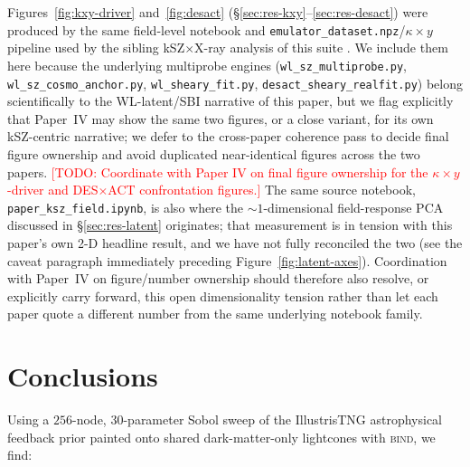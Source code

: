 \documentclass[11pt]{article}
\newcommand{\bind}{\textsc{bind}}
\newcommand{\kappay}{\kappa\times y}
\newcommand{\todo}[1]{\textcolor{red}{[TODO: #1]}}
\begin{document}
Figures~\ref{fig:kxy-driver} and~\ref{fig:desact}
(\S\ref{sec:res-kxy}–\ref{sec:res-desact}) were produced by the same
field-level notebook and \texttt{emulator\_dataset.npz}/$\kappay$ pipeline
used by the sibling kSZ$\times$X-ray analysis of this suite
\citep[Paper~IV, in prep]{bindIV}. We include them here because the
underlying multiprobe engines
(\texttt{wl\_sz\_multiprobe.py}, \texttt{wl\_sz\_cosmo\_anchor.py},
\texttt{wl\_sheary\_fit.py}, \texttt{desact\_sheary\_realfit.py}) belong
scientifically to the WL-latent/SBI narrative of this paper, but we flag
explicitly that Paper~IV may show the same two figures, or a close
variant, for its own kSZ-centric narrative; we defer to the
cross-paper coherence pass to decide final figure ownership and avoid
duplicated near-identical figures across the two papers. \todo{Coordinate
with Paper IV on final figure ownership for the $\kappay$-driver and
DES$\times$ACT confrontation figures.}
The same source notebook, \texttt{paper\_ksz\_field.ipynb}, is also where the
$\sim\!1$-dimensional field-response PCA discussed in
\S\ref{sec:res-latent} originates; that measurement is in tension with this
paper's own 2-D headline result, and we have not fully reconciled the two
(see the caveat paragraph immediately preceding
Figure~\ref{fig:latent-axes}). Coordination with Paper~IV on figure/number
ownership should therefore also resolve, or explicitly carry forward, this
open dimensionality tension rather than let each paper quote a different
number from the same underlying notebook family.

\section{Conclusions}\label{sec:conclusions}

Using a $256$-node, $30$-parameter Sobol sweep of the IllustrisTNG
astrophysical feedback prior painted onto shared dark-matter-only
lightcones with \bind{}, we find:
\end{document}
